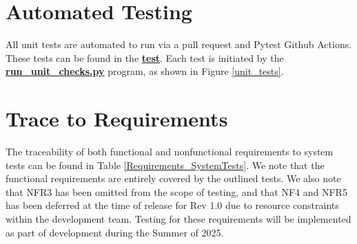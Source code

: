 \documentclass[12pt, titlepage]{article}
\begin{document}
\section{Automated Testing}
All unit tests are automated to run via a pull request and Pytest Github Actions. These tests can be found in the \href{https://github.com/KiranSingh15/CAS-741-Image-Correspondences/tree/main/test}{\textbf{test}}. Each test is initiated by the \href{https://github.com/KiranSingh15/CAS-741-Image-Correspondences/blob/main/test/run_unit_checks.py}{\textbf{run\_unit\_checks.py}} program, as shown in Figure \ref{unit_tests}. 

		
\section{Trace to Requirements}
The traceability of both functional and nonfunctional requirements to system tests can be found in Table \ref{Requirements_SystemTests}. We note that the functional requirements are entirely covered by the outlined tests. We also note that NFR3 has been omitted from the scope of testing, and that NF4 and NFR5 has been deferred at the time of release for Rev 1.0 due to resource constraints within the development team. Testing for these requirements will be implemented as part of development during the Summer of 2025.
\end{document}
